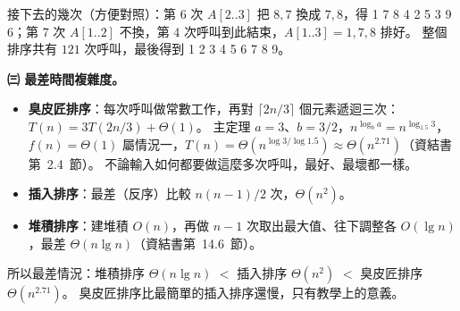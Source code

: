 \begin{pastsoln}
接下去的幾次（方便對照）：第 6 次 $A[2..3]$ 把 $8, 7$ 換成 $7, 8$，得 1 7 8 4 2 5 3 9 6；第 7 次
$A[1..2]$ 不換，第 4 次呼叫到此結束，$A[1..3] = 1, 7, 8$ 排好。 整個排序共有 $121$ 次呼叫，最後得到
1 2 3 4 5 6 7 8 9。

\textbf{㈢ 最差時間複雜度。}
\begin{itemize}[nosep]
\item \textbf{臭皮匠排序}：每次呼叫做常數工作，再對 $\lceil 2n/3 \rceil$ 個元素遞迴三次：
$T(n) = 3T(2n/3) + \Theta(1)$。 主定理 $a = 3$、$b = 3/2$，$n^{\log_b a} = n^{\log_{1.5} 3}$，
$f(n) = \Theta(1)$ 屬情況一，$T(n) = \Theta(n^{\log 3 / \log 1.5}) \approx \Theta(n^{2.71})$（資結書
第~2.4~節）。 不論輸入如何都要做這麼多次呼叫，最好、最壞都一樣。
\item \textbf{插入排序}：最差（反序）比較 $n(n-1)/2$ 次，$\Theta(n^2)$。
\item \textbf{堆積排序}：建堆積 $O(n)$，再做 $n - 1$ 次取出最大值、往下調整各 $O(\lg n)$，最差
$\Theta(n \lg n)$（資結書第~14.6~節）。
\end{itemize}
所以最差情況：堆積排序 $\Theta(n \lg n)$ $<$ 插入排序 $\Theta(n^2)$ $<$ 臭皮匠排序 $\Theta(n^{2.71})$。
臭皮匠排序比最簡單的插入排序還慢，只有教學上的意義。
\end{pastsoln}
